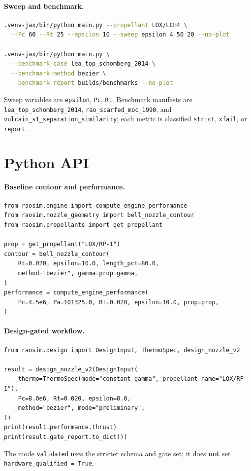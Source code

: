 \documentclass[11pt]{article}
\newcommand{\cmd}[1]{\nolinkurl{#1}}
\newcommand{\code}[1]{\texttt{#1}}
\begin{document}
\paragraph{Sweep and benchmark.}
\begin{lstlisting}[language=bash]
.venv-jax/bin/python main.py --propellant LOX/LCH4 \
  --Pc 60 --Rt 25 --epsilon 10 --sweep epsilon 4 50 20 --no-plot

.venv-jax/bin/python main.py \
  --benchmark-case lea_top_schomberg_2014 \
  --benchmark-method bezier \
  --benchmark-report builds/benchmarks --no-plot
\end{lstlisting}
Sweep variables are \code{epsilon}, \code{Pc}, \code{Rt}. Benchmark manifests
are \cmd{lea_top_schomberg_2014}, \cmd{rao_scarfed_moc_1990}, and
\cmd{vulcain_s1_separation_similarity}; each metric is classified
\code{strict}, \code{xfail}, or \code{report}.

\section{Python API}

\paragraph{Baseline contour and performance.}
\begin{lstlisting}[style=py]
from raosim.engine import compute_engine_performance
from raosim.nozzle_geometry import bell_nozzle_contour
from raosim.propellants import get_propellant

prop = get_propellant("LOX/RP-1")
contour = bell_nozzle_contour(
    Rt=0.020, epsilon=10.0, length_pct=80.0,
    method="bezier", gamma=prop.gamma,
)
performance = compute_engine_performance(
    Pc=4.5e6, Pa=101325.0, Rt=0.020, epsilon=10.0, prop=prop,
)
\end{lstlisting}

\paragraph{Design-gated workflow.}
\begin{lstlisting}[style=py]
from raosim.design import DesignInput, ThermoSpec, design_nozzle_v2

result = design_nozzle_v2(DesignInput(
    thermo=ThermoSpec(mode="constant_gamma", propellant_name="LOX/RP-1"),
    Pc=8.0e6, Rt=0.020, epsilon=8.0,
    method="bezier", mode="preliminary",
))
print(result.performance.thrust)
print(result.gate_report.to_dict())
\end{lstlisting}
The mode \code{validated} uses the stricter schema and gate set; it does
\textbf{not} set \code{hardware\_qualified = True}.
\end{document}
